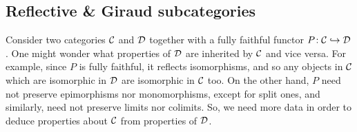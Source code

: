 \subsection{Reflective \& Giraud subcategories}
Consider two categories \(\mathcal{C}\) and \(\mathcal{D}\) together with a fully faithful functor \(P\!:\mathcal{C}\hookrightarrow\mathcal{D}\). One might wonder what properties of \(\mathcal{D}\) are inherited by \(\mathcal{C}\) and vice versa.
For example, since \(P\) is fully faithful, it reflects isomorphisms, and so any objects in \(\mathcal{C}\) which are isomorphic in \(\mathcal{D}\) are isomorphic in \(\mathcal{C}\) too. On the other hand,
\(P\) need not preserve epimorphisms nor monomorphisms, except for split ones, and similarly, need not preserve limits nor colimits. So, we need more data in order to deduce
properties about \(\mathcal{C}\) from properties of \(\mathcal{D}\).

